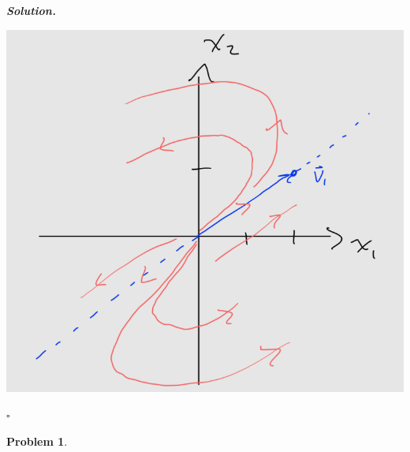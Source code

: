 \documentclass[12pt]{report}
\newtheorem{problem}{Problem}
\newenvironment{solution}[1][\it{Solution}]{\textbf{#1. } }{$\square$}
\begin{document}
\begin{solution}
\begin{enumerate}
        \begin{center}
            \includegraphics[width=.6\linewidth]{images/3.PNG}
         \end{center}
    \end{enumerate}
\end{solution}
\newpage



\begin{problem}
    
\end{problem}
\end{document}
